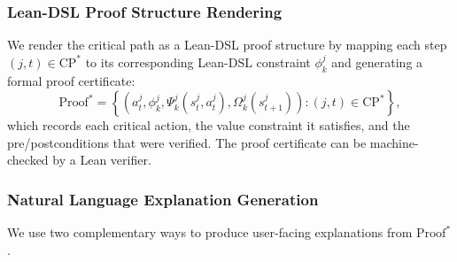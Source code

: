 \documentclass[12pt,a4paper]{article}
\begin{document}
\subsubsection{Lean-DSL Proof Structure Rendering}

We render the critical path as a Lean-DSL proof structure by mapping each step
$(j, t) \in \mathrm{CP}^*$ to its corresponding Lean-DSL constraint $\phi^j_k$ and
generating a formal proof certificate:
\begin{equation}
  \mathrm{Proof}^* = \left\{(a^j_t, \phi^j_k, \Psi^j_k(s^j_t, a^j_t),
  \Omega^j_k(s^j_{t+1})) : (j, t) \in \mathrm{CP}^*\right\},
  \label{eq:proof_certificate}
\end{equation}
which records each critical action, the value constraint it satisfies, and the
pre/postconditions that were verified. The proof certificate can be machine-checked
by a Lean verifier.




\subsubsection{Natural Language Explanation Generation}

We use two complementary ways to produce user-facing explanations from
$\mathrm{Proof}^*$.
\end{document}
